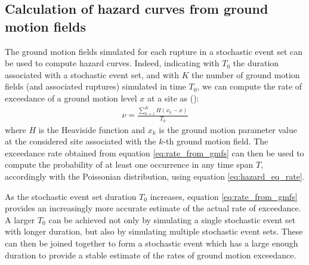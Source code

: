 \subsection{Calculation of hazard curves from ground motion fields}
The ground motion fields simulated for each rupture in a stochastic event set can be used to
compute hazard curves. Indeed, indicating with $T_{0}$ the duration associated with a stochastic
event set, and with $K$ the number of ground motion fields (and associated ruptures) simulated
in time $T_{0}$, we can compute the rate of exceedance of a ground motion level $x$ at a site as (\cite{ebel1999}):
\begin{align}
\label{eq:rate_from_gmfs}
\nu = \frac{\sum_{k=1}^{K}H(x_{k} - x)}{T_{0}}
\end{align}
where $H$ is the Heaviside function and $x_{k}$ is the ground motion parameter value at the considered site associated
with the $k$-th ground motion field. The exceedance rate obtained from equation \ref{eq:rate_from_gmfs} can then be
used to compute the probability of at least one occurrence in any time span $T$, accordingly with the Poissonian distribution,
using equation \ref{eq:hazard_eq_rate}.

As the stochastic event set duration $T_{0}$ increases, equation \ref{eq:rate_from_gmfs}
provides an increasingly more accurate estimate of the actual rate of exceedance. A larger $T_{0}$ can be achieved
not only by simulating a single stochastic event set with longer duration, but also by simulating multiple
stochastic event sets. These can then be joined together to form a stochastic event which has a large enough
duration to provide a stable estimate of the rates of ground motion exceedance.

